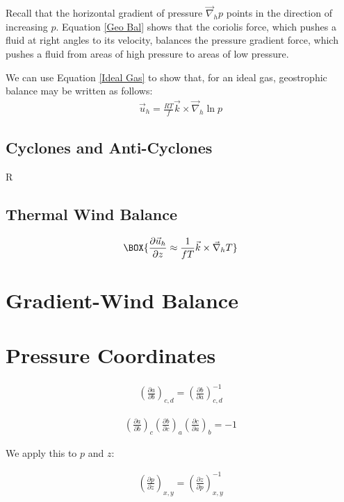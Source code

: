 Recall that the horizontal gradient of pressure $\vec{\nabla}_h p$ points in the direction of increasing $p$. Equation \ref{Geo Bal} shows that the coriolis force, which pushes a fluid at right angles to its velocity, balances the pressure gradient force, which pushes a fluid from areas of high pressure to areas of low pressure.

We can use Equation \ref{Ideal Gas} to show that, for an ideal gas, geostrophic balance may be written as follows:
\begin{align}
    \vec{u}_h=\frac{RT}{ f}\vec{k}\times\vec{\nabla}_h\ln p
\end{align}

\subsection{Cyclones and Anti-Cyclones}

R

\subsection{Thermal Wind Balance}

\begin{align}\label{Thermal Wind}
    \BOX{\frac{\partial\vec{u}_h}{\partial z}\approx\frac{1}{fT}\vec{k}\times\vec{\nabla}_hT}
\end{align}

\section{Gradient-Wind Balance}

\section{Pressure Coordinates}

\begin{align*}
    \left(\frac{\partial a}{\partial b}\right)_{c,d}=\left(\frac{\partial b}{\partial a}\right)_{c,d}^{-1}
\end{align*}

\begin{align*}
    \left(\frac{\partial a}{\partial b}\right)_c
    \left(\frac{\partial b}{\partial c}\right)_a
    \left(\frac{\partial c}{\partial a}\right)_b
    =-1
\end{align*}

\noindent We apply this to $p$ and $z$:

\begin{align}
    \left(\frac{\partial p}{\partial z}\right)_{x,y}=\left(\frac{\partial z}{\partial p}\right)_{x,y}^{-1}
\end{align}


